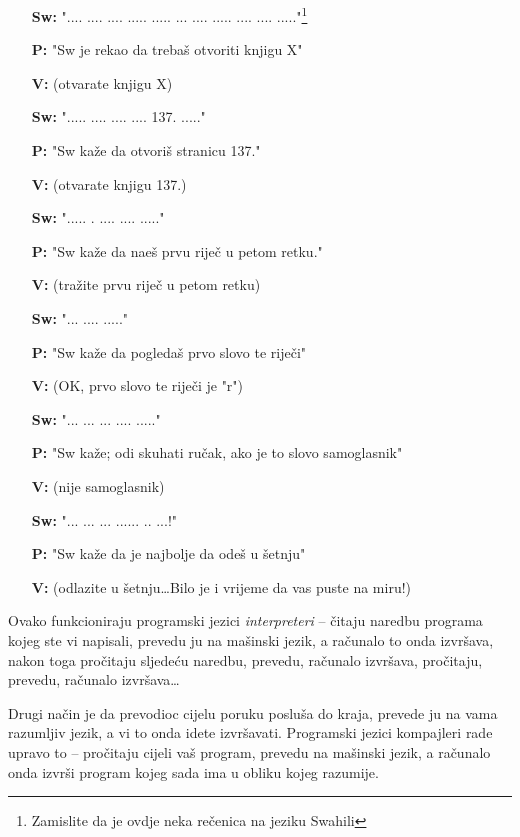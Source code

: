 	\begin{itemize}
		\item[\textbf{Sw:}] ".... .... .... ..... ..... ... .... ..... .... .... ....."\footnote{Zamislite da je ovdje neka re\v{c}enica na jeziku Swahili}
		\item[\textbf{P:}] "Sw je rekao da treba\v{s} otvoriti knjigu X"
		\item[\textbf{V:}] (otvarate knjigu X)
		\item[\textbf{Sw:}] "..... .... .... .... 137. ....."
		\item[\textbf{P:}] "Sw ka\v{z}e da otvori\v{s} stranicu 137."
		\item[\textbf{V:}] (otvarate knjigu 137.)
		\item[\textbf{Sw:}] "..... . .... ....  ....."
		\item[\textbf{P:}] "Sw ka\v{z}e da na\dj{}e\v{s} prvu rije\v{c} u petom retku."
		\item[\textbf{V:}] (tra\v{z}ite prvu rije\v{c} u petom retku)
		\item[\textbf{Sw:}] "... ....  ....."
		\item[\textbf{P:}] "Sw ka\v{z}e da pogleda\v{s} prvo slovo te rije\v{c}i"
		\item[\textbf{V:}] (OK, prvo slovo te rije\v{c}i je "r")
		\item[\textbf{Sw:}] "...  ... ... ....  ....."
		\item[\textbf{P:}] "Sw ka\v{z}e; odi skuhati ru\v{c}ak, ako je to slovo samoglasnik"
		\item[\textbf{V:}] (nije samoglasnik)
		\item[\textbf{Sw:}] "...  ... ... ......  .. ...!"
		\item[\textbf{P:}] "Sw ka\v{z}e da je najbolje da ode\v{s} u \v setnju"
		\item[\textbf{V:}] (odlazite u \v{s}etnju\dots Bilo je i vrijeme da vas puste na miru!)
	\end{itemize}

	Ovako funkcioniraju programski jezici \emph{interpreteri} -- \v{c}itaju naredbu
	programa kojeg ste vi napisali, prevedu ju na ma\v{s}inski jezik, a ra\v{c}unalo to
	onda izvr\v{s}ava, nakon toga pro\v{c}itaju sljede\'{c}u naredbu, prevedu,
	ra\v{c}unalo izvr\v{s}ava, pro\v{c}itaju, prevedu, ra\v{c}unalo izvr\v{s}ava\dots

	Drugi na\v{c}in je da prevodioc cijelu poruku poslu\v{s}a do kraja, prevede ju
	na vama razumljiv jezik, a vi to onda idete izvr\v{s}avati. Programski jezici
	kompajleri rade upravo to -- pro\v{c}itaju cijeli va\v{s} program, prevedu na
	ma\v{s}inski jezik, a ra\v{c}unalo onda izvr\v{s}i program kojeg sada
	ima u obliku kojeg razumije.

